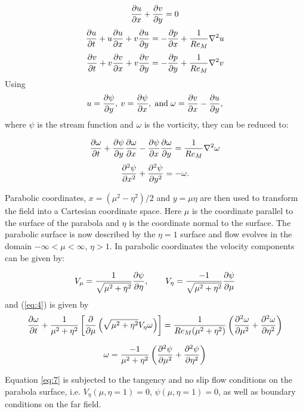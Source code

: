 \[
\frac{\partial u}{\partial x} + \frac{\partial v}{\partial y} = 0
\]
\[
\frac{\partial u}{\partial t} + u \frac{\partial u}{\partial x} + v \frac{\partial u}{\partial y} = - \frac{\partial p}{\partial x} + \frac{1}{Re_M} \nabla^2 u
\]
\begin{equation}
\label{eq:1}
\frac{\partial v}{\partial t} + v \frac{\partial v}{\partial x} + v \frac{\partial v}{\partial y} = - \frac{\partial p}{\partial y} + \frac{1}{Re_M} \nabla^2 v
\end{equation}
%
Using
\begin{equation}
\label{eq:2}
u=\frac{\partial \psi}{\partial y},\: v=\frac{\partial \psi}{\partial x},\; \mathrm{and}\; \omega=\frac{\partial v}{\partial x} - \frac{\partial u}{\partial y},
\end{equation}
%
where $\psi$ is the stream function and $\omega$ is the vorticity, they can be reduced to:

\[
\frac{\partial \omega}{\partial t} + \frac{\partial \psi}{\partial y} \frac{\partial \omega}{\partial x} - \frac{\partial \psi}{\partial x} \frac{\partial \omega}{\partial y} = \frac{1}{Re_M} \nabla^2\omega
\]
\begin{equation}
\frac{\partial^2 \psi}{\partial x^2} + \frac{\partial^2 \psi}{\partial y^2} = -\omega.
\label{eq:4}
\end{equation}

Parabolic coordinates, $x=(\mu^2-\eta^2)/2$ and $y=\mu\eta$ are then used to transform the field into a Cartesian coordinate space. Here $\mu$ is the coordinate parallel to the surface of the parabola and $\eta$ is the coordinate normal to the surface. The parabolic surface is now described by the $\eta=1$ surface and flow evolves in the domain $-\infty < \mu < \infty$, $\eta> 1$. In parabolic coordinates the velocity components can be given by:

\[
V_\mu=\frac{1}{\sqrt{\mu^2+\eta^2}} \frac{\partial \psi}{\partial \eta}, \quad\quad
V_\eta=\frac{-1}{\sqrt{\mu^2+\eta^2}} \frac{\partial \psi}{\partial \mu}
\]
% 
and (\ref{eq:4}) is given by
\[
\frac{\partial \omega}{\partial t} + \frac{1}{\mu^2 + \eta^2} \left[\frac{\partial}{\partial \mu} \left(\sqrt{\mu^2 + \eta^2} V_\eta \omega \right) \right] = \frac{1}{Re_M(\mu^2 + \eta^2)} \left(\frac{\partial^2 \omega}{\partial \mu^2} + \frac{\partial^2 \omega}{\partial \eta^2} \right)
\]

\begin{equation}
\label{eq:7}
\omega = \frac{-1}{\mu^2 + \eta^2} \left(\frac{\partial^2 \psi}{\partial \mu^2} + \frac{\partial^2 \psi}{\partial \eta^2} \right)
\end{equation}

Equation \ref{eq:7} is subjected to the tangency and no slip flow conditions on the parabola surface, i.e. $V_\eta(\mu,\eta=1) = 0$, $\psi(\mu,\eta=1) = 0$, as well as boundary conditions on the far field.

